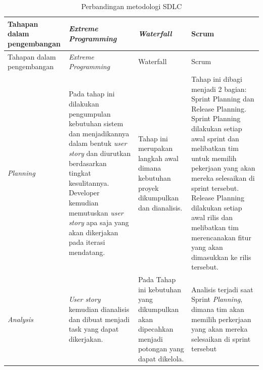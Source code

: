 \begin{longtable}[!h]
        {
            p{}
            p{}
            p{}
            p{}
        }
        \caption{Perbandingan metodologi SDLC} \\

        \hline
            Tahapan dalam pengembangan &
            \textit{Extreme Programming} &
            \textit{Waterfall} &
            Scrum \\ [0.5ex]
        \hline

        \endfirsthead


        \hline
            Tahapan dalam pengembangan &
            \textit{Extreme Programming} &
            Waterfall &
            Scrum \\ [0.5ex]
        \hline
        \endhead %
        \hline

        \endfoot
        \hline
        \endlastfoot

        \textit{Planning}
        &
        Pada tahap ini dilakukan pengumpulan kebutuhan sistem dan menjadikannya dalam bentuk \textit{user story} dan diurutkan berdasarkan tingkat kesulitannya. Developer kemudian memutuskan \textit{user story} apa saja yang akan dikerjakan pada iterasi mendatang.
        &
        Tahap ini merupakan langkah awal dimana kebutuhan proyek dikumpulkan dan dianalisis.
        &
        Tahap ini dibagi menjadi 2 bagian: Sprint Planning dan Release Planning. Sprint Planning dilakukan setiap awal sprint dan melibatkan tim untuk memilih pekerjaan yang akan mereka selesaikan di sprint tersebut. Release Planning dilakukan setiap awal rilis dan melibatkan tim merencanakan fitur yang akan dimasukkan ke rilis tersebut.

        \\
        \midrule

        \textit{Analysis}
        &
        \textit{User story} kemudian dianalisis dan dibuat menjadi task yang dapat dikerjakan.
        &
        Pada Tahap ini kebutuhan yang dikumpulkan akan dipecahkan menjadi potongan yang dapat dikelola.

        &
        Analisis terjadi saat Sprint \textit{Planning}, dimana tim akan memilih perkerjaan yang akan mereka selesaikan di sprint tersebut


\end{longtable}
